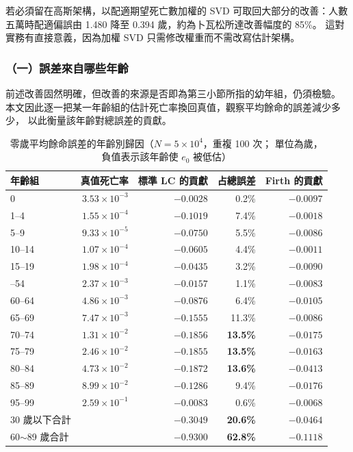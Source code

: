 \documentclass[UTF8, fontset=macnew, a4paper, 12pt]{ctexart}
\begin{document}
若必須留在高斯架構，以配適期望死亡數加權的 SVD 可取回大部分的改善：人數
五萬時配適偏誤由 1.480 降至 0.394 歲，約為卜瓦松所達改善幅度的 85\%。
這對實務有直接意義，因為加權 SVD 只需修改權重而不需改寫估計架構。

\subsubsection{（一）誤差來自哪些年齡}

前述改善固然明確，但改善的來源是否即為第三小節所指的幼年組，仍須檢驗。
本文因此逐一把某一年齡組的估計死亡率換回真值，觀察平均餘命的誤差減少多少，
以此衡量該年齡對總誤差的貢獻。

\begin{table}[H]
\centering
\caption{零歲平均餘命誤差的年齡別歸因（$N=5\times10^4$，重複 100 次；
單位為歲，負值表示該年齡使 $e_0$ 被低估）}
\small
\begin{tabular}{lrrrr}
\toprule
年齡組 & 真值死亡率 & 標準 LC 的貢獻 & 占總誤差 & Firth 的貢獻\\
\midrule
0       & $3.53\times10^{-3}$ & $-0.0028$ & 0.2\% & $-0.0097$\\
1--4    & $1.55\times10^{-4}$ & $-0.1019$ & 7.4\% & $-0.0018$\\
5--9    & $9.33\times10^{-5}$ & $-0.0750$ & 5.5\% & $-0.0086$\\
10--14  & $1.07\times10^{-4}$ & $-0.0605$ & 4.4\% & $-0.0011$\\
15--19  & $1.98\times10^{-4}$ & $-0.0435$ & 3.2\% & $-0.0090$\\
\addlinespace
50--54  & $2.37\times10^{-3}$ & $-0.0157$ & 1.1\% & $-0.0083$\\
60--64  & $4.86\times10^{-3}$ & $-0.0876$ & 6.4\% & $-0.0105$\\
65--69  & $7.47\times10^{-3}$ & $-0.1555$ & 11.3\% & $-0.0086$\\
70--74  & $1.31\times10^{-2}$ & \textbf{$-0.1856$} & \textbf{13.5\%} & $-0.0175$\\
75--79  & $2.46\times10^{-2}$ & \textbf{$-0.1855$} & \textbf{13.5\%} & $-0.0163$\\
80--84  & $4.73\times10^{-2}$ & \textbf{$-0.1872$} & \textbf{13.6\%} & $-0.0413$\\
85--89  & $8.99\times10^{-2}$ & $-0.1286$ & 9.4\% & $-0.0176$\\
95--99  & $2.59\times10^{-1}$ & $-0.0083$ & 0.6\% & $-0.0068$\\
\midrule
30 歲以下合計 & & $-0.3049$ & \textbf{20.6\%} & $-0.0464$\\
60$\sim$89 歲合計 & & $-0.9300$ & \textbf{62.8\%} & $-0.1118$\\
\bottomrule
\end{tabular}
\label{tab:e0attr}
\end{table}
\end{document}
